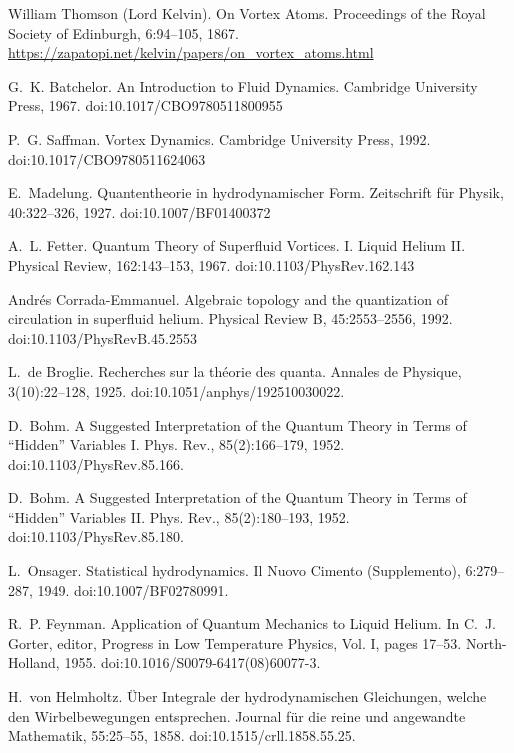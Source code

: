 \documentclass[11pt,a4paper]{article}
\begin{document}

\begin{thebibliography}{99}


William Thomson (Lord Kelvin).
On Vortex Atoms.
Proceedings of the Royal Society of Edinburgh, 6:94--105, 1867.
\url{https://zapatopi.net/kelvin/papers/on_vortex_atoms.html}

G.~K. Batchelor.
An Introduction to Fluid Dynamics.
Cambridge University Press, 1967.
doi:10.1017/CBO9780511800955

P.~G. Saffman.
Vortex Dynamics.
Cambridge University Press, 1992.
doi:10.1017/CBO9780511624063

E.~Madelung.
Quantentheorie in hydrodynamischer Form.
Zeitschrift f{\"u}r Physik, 40:322--326, 1927.
doi:10.1007/BF01400372

A.~L. Fetter.
Quantum Theory of Superfluid Vortices. I. Liquid Helium II.
Physical Review, 162:143--153, 1967.
doi:10.1103/PhysRev.162.143


Andr{\'e}s Corrada-Emmanuel.
Algebraic topology and the quantization of circulation in superfluid helium.
Physical Review B, 45:2553--2556, 1992.
doi:10.1103/PhysRevB.45.2553

L.~de Broglie.
Recherches sur la th{\'e}orie des quanta.
Annales de Physique, 3(10):22--128, 1925.
doi:10.1051/anphys/192510030022.

D.~Bohm.
A Suggested Interpretation of the Quantum Theory in Terms of ``Hidden'' Variables I.
Phys. Rev., 85(2):166--179, 1952.
doi:10.1103/PhysRev.85.166.

D.~Bohm.
A Suggested Interpretation of the Quantum Theory in Terms of ``Hidden'' Variables II.
Phys. Rev., 85(2):180--193, 1952.
doi:10.1103/PhysRev.85.180.

L.~Onsager.
Statistical hydrodynamics.
Il Nuovo Cimento (Supplemento), 6:279--287, 1949.
doi:10.1007/BF02780991.

R.~P. Feynman.
Application of Quantum Mechanics to Liquid Helium.
In C.~J. Gorter, editor, Progress in Low Temperature Physics, Vol. I, pages 17--53. North-Holland, 1955.
doi:10.1016/S0079-6417(08)60077-3.

H.~von Helmholtz.
{\"U}ber Integrale der hydrodynamischen Gleichungen, welche den Wirbelbewegungen entsprechen.
Journal f{\"u}r die reine und angewandte Mathematik, 55:25--55, 1858.
doi:10.1515/crll.1858.55.25.


\end{thebibliography}
\end{document}
